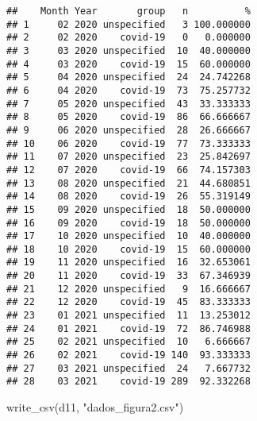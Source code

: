 \documentclass[
]{article}
\newenvironment{Shaded}{\begin{snugshade}}{\end{snugshade}}
\newcommand{\AttributeTok}[1]{\textcolor[rgb]{0.77,0.63,0.00}{#1}}
\newcommand{\CommentTok}[1]{\textcolor[rgb]{0.56,0.35,0.01}{\textit{#1}}}
\newcommand{\ConstantTok}[1]{\textcolor[rgb]{0.00,0.00,0.00}{#1}}
\newcommand{\DecValTok}[1]{\textcolor[rgb]{0.00,0.00,0.81}{#1}}
\newcommand{\FunctionTok}[1]{\textcolor[rgb]{0.00,0.00,0.00}{#1}}
\newcommand{\NormalTok}[1]{#1}
\newcommand{\OtherTok}[1]{\textcolor[rgb]{0.56,0.35,0.01}{#1}}
\newcommand{\SpecialCharTok}[1]{\textcolor[rgb]{0.00,0.00,0.00}{#1}}
\newcommand{\StringTok}[1]{\textcolor[rgb]{0.31,0.60,0.02}{#1}}
\begin{document}
\begin{Shaded}
\end{Shaded}

\begin{verbatim}
##    Month Year       group   n          %
## 1     02 2020 unspecified   3 100.000000
## 2     02 2020    covid-19   0   0.000000
## 3     03 2020 unspecified  10  40.000000
## 4     03 2020    covid-19  15  60.000000
## 5     04 2020 unspecified  24  24.742268
## 6     04 2020    covid-19  73  75.257732
## 7     05 2020 unspecified  43  33.333333
## 8     05 2020    covid-19  86  66.666667
## 9     06 2020 unspecified  28  26.666667
## 10    06 2020    covid-19  77  73.333333
## 11    07 2020 unspecified  23  25.842697
## 12    07 2020    covid-19  66  74.157303
## 13    08 2020 unspecified  21  44.680851
## 14    08 2020    covid-19  26  55.319149
## 15    09 2020 unspecified  18  50.000000
## 16    09 2020    covid-19  18  50.000000
## 17    10 2020 unspecified  10  40.000000
## 18    10 2020    covid-19  15  60.000000
## 19    11 2020 unspecified  16  32.653061
## 20    11 2020    covid-19  33  67.346939
## 21    12 2020 unspecified   9  16.666667
## 22    12 2020    covid-19  45  83.333333
## 23    01 2021 unspecified  11  13.253012
## 24    01 2021    covid-19  72  86.746988
## 25    02 2021 unspecified  10   6.666667
## 26    02 2021    covid-19 140  93.333333
## 27    03 2021 unspecified  24   7.667732
## 28    03 2021    covid-19 289  92.332268
\end{verbatim}

\begin{Shaded}
\begin{Highlighting}[]
\FunctionTok{write\_csv}\NormalTok{(d11, }\StringTok{"dados\_figura2.csv"}\NormalTok{)}
\end{Highlighting}
\end{Shaded}
\end{document}
